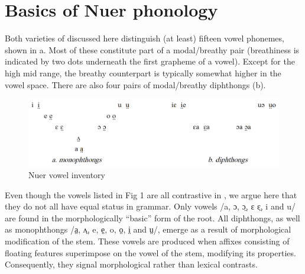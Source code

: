 \documentclass[output=paper
,newtxmath
,modfonts
,nonflat]{langsci/langscibook}
\begin{document}
\section{Basics of Nuer phonology} %

Both varieties of  discussed here distinguish (at least) fifteen vowel phonemes, shown in a.  Most of these constitute part of a modal/breathy pair (breathiness is indicated by two dots underneath the first grapheme of a vowel).  Except for the high mid range, the breathy counterpart is typically somewhat higher in the vowel space. There are also four pairs of modal/breathy diphthongs (b). 



\begin{figure}
	\includegraphics[width=\textwidth]{figures/fig-monich-1.png}
	\caption{Nuer vowel inventory}
	\label{fig:monich:1}
\end{figure}


Even though the vowels listed in Fig 1 are all contrastive in , we argue here that they do not all have equal status in  grammar.  Only vowels /a, ɔ, ɔ̤, ɛ ɛ̤, i and u/ are found in the morphologically “basic” form of the root.  All diphthongs, as well as monophthongs /a̤, ʌ̤, e, e̤, o, o̤, i̤ and ṳ/, emerge as a result of morphological modification of the stem.  These vowels are produced when affixes consisting of floating features superimpose on the vowel of the stem, modifying its properties.  Consequently, they signal morphological rather than lexical contrasts.
\end{document}
